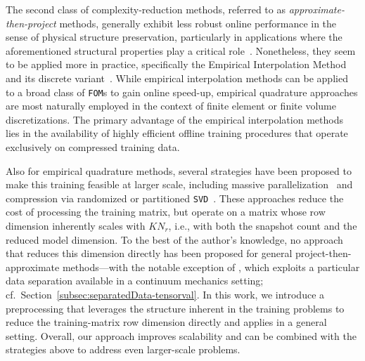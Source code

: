 \documentclass[onefignum,onetabnum]{siamart251104}
\newcommand{\Nr}{{N_r}}
\newcommand{\acro}[1]{{\texttt{#1}}}  %
\begin{document}
The second class of complexity-reduction methods, referred to as \textit{approx{\-}imate{\-}-then{\-}-project} methods, generally exhibit less robust online performance in the sense of physical structure preservation, particularly in applications where the aforementioned structural properties play a critical role~\cite{art:morParamHamHesthaven,art:lilsailer-nlfow,art-equad-DG-chan}. Nonetheless, they seem to be applied more in practice, specifically the Empirical Interpolation Method and its discrete variant~\cite{art:deim-state-space-err,art:deim-canon-str}.
While empirical interpolation methods can be applied to a broad class of \acro{FOM}s to gain online speed-up, empirical quadrature approaches are most naturally employed in the context of finite element or finite volume discretizations.
%
The primary advantage of the empirical interpolation methods lies in the availability of highly efficient offline training procedures that operate exclusively on compressed training data.


Also for empirical quadrature methods, several strategies have been proposed to make this training feasible at larger scale, including massive parallelization~\cite{art:equad-eff-yano,art:grimberg2021mesh} and compression via randomized or partitioned \acro{SVD}~\cite{hernandez2024cecm,art:hyperreduction-fem-cubature,art:MartinssonVoronin2016}. These approaches reduce the cost of processing the training matrix, but operate on a matrix whose row dimension inherently scales with $K\Nr$, i.e., with both the snapshot count and the reduced model dimension. To the best of the author's knowledge, no approach that reduces this dimension directly has been proposed for general project-then-approximate methods---with the notable exception of \cite{art:Guo2024,art:Guo2024-secOrd}, which exploits a particular data separation available in a continuum mechanics setting; cf.\ Section~\ref{subsec:separatedData-tensorval}. In this work, we introduce a preprocessing that leverages the structure inherent in the training problems to reduce the training-matrix row dimension directly and applies in a general setting. Overall, our approach improves scalability and can be combined with the strategies above to address even larger-scale problems.
\end{document}
